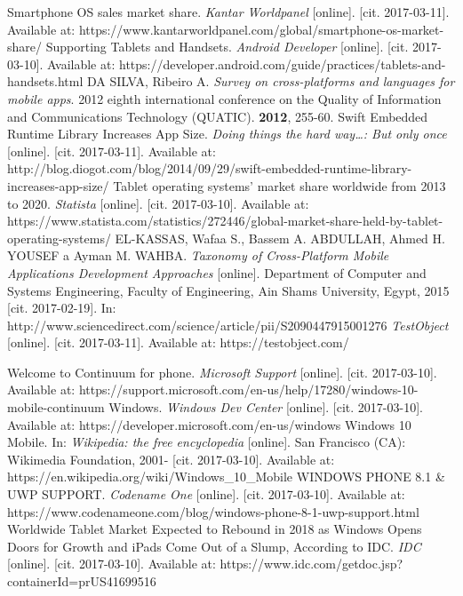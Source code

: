 \documentclass[english,master,public,dept460,male,cpdeclaration,oneside]{diploma}
\begin{document}
\begin{thebibliography}{99}
	 Smartphone OS sales market share. \textit{Kantar Worldpanel} [online]. [cit. 2017-03-11]. Available at: https://www.kantarworldpanel.com/global/smartphone-os-market-share/
	 Supporting Tablets and Handsets. \textit{Android Developer} [online]. [cit. 2017-03-10]. Available at: https://developer.android.com/guide/practices/tablets-and-handsets.html
	 DA SILVA, Ribeiro A. \textit{Survey on cross-platforms and languages for mobile apps}. 2012 eighth international conference on the Quality of Information and Communications Technology (QUATIC). \textbf{2012}, 255-60.
	 Swift Embedded Runtime Library Increases App Size. \textit{Doing things the hard way…: But only once} [online]. [cit. 2017-03-11]. Available at: http://blog.diogot.com/blog/2014/09/29/swift-embedded-runtime-library-increases-app-size/
	 Tablet operating systems' market share worldwide from 2013 to 2020. \textit{Statista} [online]. [cit. 2017-03-10]. Available at: https://www.statista.com/statistics/272446/global-market-share-held-by-tablet-operating-systems/
	EL-KASSAS, Wafaa S., Bassem A. ABDULLAH, Ahmed H. YOUSEF a Ayman M. WAHBA. \textit{Taxonomy of Cross-Platform Mobile Applications Development Approaches} [online]. Department of Computer and Systems Engineering, Faculty of Engineering, Ain Shams University, Egypt, 2015 [cit. 2017-02-19]. In: http://www.sciencedirect.com/science/article/pii/S2090447915001276
	 \textit{TestObject} [online]. [cit. 2017-03-11]. Available at: https://testobject.com/
		
	 Welcome to Continuum for phone. \textit{Microsoft Support} [online]. [cit. 2017-03-10]. Available at: https://support.microsoft.com/en-us/help/17280/windows-10-mobile-continuum	
	 Windows. \textit{Windows Dev Center} [online]. [cit. 2017-03-10]. Available at: https://developer.microsoft.com/en-us/windows
	 Windows 10 Mobile. In: \textit{Wikipedia: the free encyclopedia} [online]. San Francisco (CA): Wikimedia Foundation, 2001- [cit. 2017-03-10]. Available at: https://en.wikipedia.org/wiki/Windows\_10\_Mobile					
	 WINDOWS PHONE 8.1 \& UWP SUPPORT. \textit{Codename One} [online]. [cit. 2017-03-10]. Available at: https://www.codenameone.com/blog/windows-phone-8-1-uwp-support.html
	 Worldwide Tablet Market Expected to Rebound in 2018 as Windows Opens Doors for Growth and iPads Come Out of a Slump, According to IDC. \textit{IDC} [online]. [cit. 2017-03-10]. Available at: https://www.idc.com/getdoc.jsp?containerId=prUS41699516
\end{thebibliography}
\end{document}
